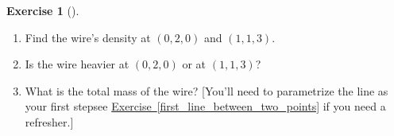 \documentclass[10pt,]{book}
\theoremstyle{plain}
\theoremstyle{definition}
\theoremstyle{definition}
\theoremstyle{definition}
\theoremstyle{definition}
\newtheorem{exploration}[project]{Exercise}
\theoremstyle{definition}
\numberwithin{equation}{section}
\begin{document}
\begin{exploration}[]\label{exploration-219}
\leavevmode%
\begin{enumerate}[font=\bfseries,label=(\alph*),ref=\alph*]
\item\label{task-561} Find the wire's density at \((0,2,0)\) and \((1,1,3)\).%
\item\label{task-562} Is the wire heavier at \((0,2,0)\) or at \((1,1,3)\)?%
\item\label{task-563} What is the total mass of the wire?  [You'll need to parametrize the line as your first step\textemdash{}see \hyperref[first_line_between_two_points]{Exercise~\ref{first_line_between_two_points}} if you need a refresher.]%
\end{enumerate}
\end{exploration}
\typeout{************************************************}
\typeout{************************************************}
\end{document}
